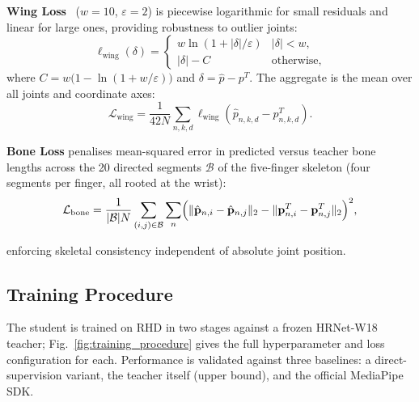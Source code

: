 \documentclass[11pt,conference,a4paper]{APSIPA2026}
\begin{document}
\noindent\textbf{Wing Loss}~\cite{wingloss2018} ($w{=}10$,
$\varepsilon{=}2$) is piecewise logarithmic for small residuals and
linear for large ones, providing robustness to outlier joints:
\begin{equation}
    \ell_{\mathrm{wing}}(\delta) =
    \begin{cases}
        w\ln\!\left(1+|\delta|/\varepsilon\right) & |\delta| < w,\\
        |\delta| - C                               & \text{otherwise},
    \end{cases}
    \label{eq:wing}
\end{equation}
where $C = w\bigl(1 - \ln(1+w/\varepsilon)\bigr)$ and
$\delta = \hat{p} - p^{T}$.  The aggregate is the mean over all
joints and coordinate axes:
\begin{equation}
    \mathcal{L}_{\mathrm{wing}} =
    \frac{1}{42N}\sum_{n,k,d}
    \ell_{\mathrm{wing}}\!\left(\hat{p}_{n,k,d}-p^{T}_{n,k,d}\right).
    \label{eq:wing_agg}
\end{equation}

\noindent\textbf{Bone Loss} penalises mean-squared error in predicted
versus teacher bone lengths across the 20 directed segments
$\mathcal{B}$ of the five-finger skeleton (four segments per finger,
all rooted at the wrist):
\begin{equation}
    \mathcal{L}_{\mathrm{bone}} =
    \frac{1}{|\mathcal{B}|N}
    \sum_{(i,j)\in\mathcal{B}}\sum_{n}
    \Bigl(
      \|\hat{\mathbf{p}}_{n,i}-\hat{\mathbf{p}}_{n,j}\|_2
      -
      \|\mathbf{p}^{T}_{n,i}-\mathbf{p}^{T}_{n,j}\|_2
    \Bigr)^{2},
    \label{eq:bone}
\end{equation}

enforcing skeletal consistency independent of absolute joint position.


\subsection{Training Procedure}

The student is trained on RHD in two stages against a frozen HRNet-W18 teacher; Fig.~\ref{fig:training_procedure} gives the full hyperparameter and loss configuration for each. Performance is validated against three baselines: a direct-supervision variant, the teacher itself (upper bound), and the official MediaPipe SDK.
\end{document}
